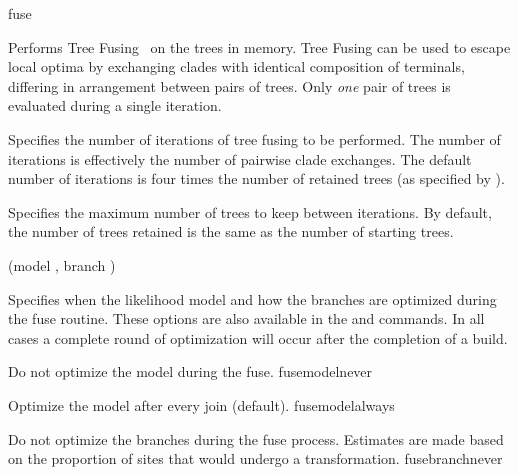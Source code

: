 \begin{command}{fuse}{}


    \begin{poydescription}
        Performs Tree Fusing~\cite{goloboff1999} on the trees in memory.  Tree
        Fusing  can be used to escape local optima by exchanging clades with
        identical composition of terminals, differing in arrangement between pairs
        of trees. Only \emph{one} pair of trees is evaluated during a single iteration.
    \end{poydescription}

    \begin{arguments}
            {Specifies the number of iterations of tree fusing to be performed. The
            number of iterations is effectively the number of pairwise clade exchanges. 
            The default number of iterations is four times the number of retained
            trees (as specified by ).}
            {}

            {Specifies the maximum number of trees to keep between iterations.
            By default, the number of trees retained is the same as the number
            of starting trees.}
            {}
                  
         {(model \optional {\poylident}, branch \optional {\poylident})}
            {Specifies when the likelihood model and how the branches are
            optimized during the fuse routine. These options are also available
            in the  and  commands. In all
            cases a complete round of optimization will occur after the
            completion of a build.

            \begin{description}

                    {Do not optimize the model during the fuse.}
                    {fusemodelnever}

                    {Optimize the model after every join (default).}
                    {fusemodelalways}

                    {Do not optimize the branches during the fuse process.
                    Estimates are made based on the proportion of sites that
                    would undergo a transformation.}
                    {fusebranchnever}


\end{description}}
\end{arguments}
\end{command}
